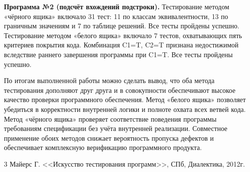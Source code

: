\documentclass{article}[14pt]
\begin{document}
\textbf{Программа №2 (подсчёт вхождений подстроки).}
Тестирование методом «чёрного ящика» включало 31 тест: 11 по классам эквивалентности,
13 по граничным значениям и 7 по таблице решений. Все тесты пройдены успешно.
Тестирование методом «белого ящика» включало 7 тестов, охватывающих пять критериев покрытия
кода. Комбинация C1=T, C2=T признана недостижимой вследствие раннего завершения программы
при C1=T. Все тесты пройдены успешно.

По итогам выполненной работы можно сделать вывод, что оба метода тестирования дополняют
друг друга и в совокупности обеспечивают высокое качество проверки программного обеспечения.
Метод «белого ящика» позволяет убедиться в корректности внутренней логики и полноте охвата
всех ветвей кода. Метод «чёрного ящика» проверяет соответствие поведения программы требованиям
спецификации без учёта внутренней реализации. Совместное применение обоих методов снижает
вероятность пропуска дефектов и обеспечивает комплексную верификацию программного продукта.

\pagebreak

\begin{thebibliography}{3}
	\bibitem{[1]} Майерс Г. <<Искусство тестирования программ>>, СПб, Диалектика, 2012г.
\end{thebibliography}
\end{document}
